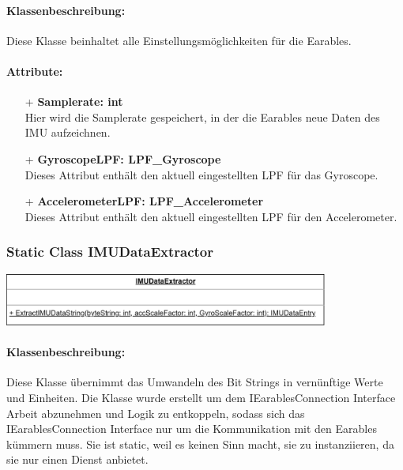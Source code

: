 \documentclass[a4paper,12pt]{article}
\begin{document}
\paragraph{Klassenbeschreibung:}
Diese Klasse beinhaltet alle Einstellungsmöglichkeiten für die \Gls{Earables}.

\paragraph{Attribute:}
\begin{itemize}
	\item[+] \textbf{Samplerate: int}\\Hier wird die Samplerate gespeichert, in der die \Gls{Earables} neue Daten des IMU aufzeichnen.
	\item[+] \textbf{GyroscopeLPF: LPF\_Gyroscope}\\Dieses Attribut enthält den aktuell eingestellten LPF für das Gyroscope.
	\item[+] \textbf{AccelerometerLPF: LPF\_Accelerometer}\\Dieses Attribut enthält den aktuell eingestellten LPF für den Accelerometer.
\end{itemize}


\begin{minipage}[b]{0.5\textwidth}
	\subsubsection{Static Class IMUDataExtractor}
	
	\end{minipage}
	\begin{minipage}[c]{0.5\textwidth}
	\includegraphics[width=0.8\textwidth]{bilder/BibPackageKlassen/IMUDataExtractor.png}
\end{minipage}
\paragraph{Klassenbeschreibung:}
Diese Klasse übernimmt das Umwandeln des Bit Strings in vernünftige Werte und Einheiten.
Die Klasse wurde erstellt um dem IEarablesConnection Interface Arbeit abzunehmen und Logik zu entkoppeln, sodass sich das IEarablesConnection
Interface nur um die Kommunikation mit den \Gls{Earables} kümmern muss. Sie ist static, weil es keinen Sinn macht, sie zu instanziieren, da sie nur einen Dienst anbietet.
\end{document}
